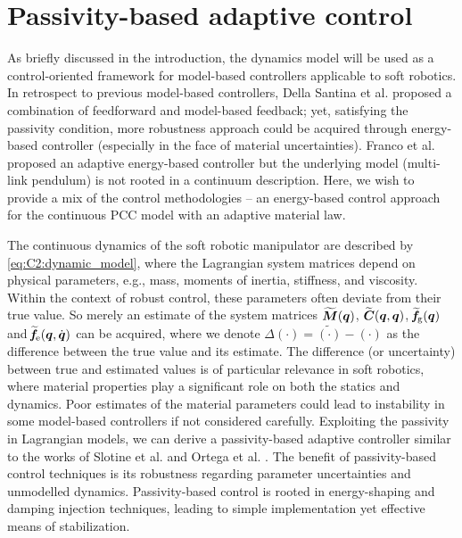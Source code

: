 \newpage
\section{Passivity-based adaptive control}
\noindent As briefly discussed in the introduction, the dynamics model will be used as a control-oriented framework for model-based controllers applicable to soft robotics. In retrospect to previous model-based controllers, Della Santina et al.  \cite{DellaSantina2020} proposed a combination of feedforward and model-based feedback; yet, satisfying the passivity condition, more robustness approach could be acquired through energy-based controller (especially in the face of material uncertainties). Franco et al. \cite{Franco2020} proposed an adaptive energy-based controller but the underlying model (multi-link pendulum) is not rooted in a continuum description. Here, we wish to provide a mix of the control methodologies -- an energy-based control approach for the continuous PCC model with an adaptive material law.

The continuous dynamics of the soft robotic manipulator are described by \eqref{eq:C2:dynamic_model}, where the Lagrangian system matrices depend on physical parameters, e.g., mass, moments of inertia, stiffness, and viscosity. Within the context of robust control, these parameters often deviate from their true value. So merely an estimate of the system matrices $\widetilde{\boldsymbol{M}}({\boldsymbol{q}})$, $\widetilde{\boldsymbol{C}}({\boldsymbol{q}},{\boldsymbol{q}})$, $\widetilde{\!\boldsymbol{f}}\!_{\scriptstyle\textrm{g}}({\boldsymbol{q}})$ and $\widetilde{\!\boldsymbol{f}}\!_{\scriptstyle\textrm{e}}({\boldsymbol{q}},{\dot{\boldsymbol{q}}})$ can be acquired, where we denote $
\Delta (\cdot) = \tilde{(\cdot)} - (\cdot)$ as the difference between the true value and its estimate. The difference (or uncertainty) between true and estimated values is of particular relevance in soft robotics, where material properties play a significant role on both the statics and dynamics. Poor estimates of the material parameters could lead to instability in some model-based controllers if not considered carefully. Exploiting the passivity in Lagrangian models, we can derive a passivity-based adaptive controller similar to the works of Slotine et al. \cite{Slotine1988} and Ortega et al. \cite{Ortega1998}. The benefit of passivity-based control techniques is its robustness regarding parameter uncertainties and unmodelled dynamics. Passivity-based control is rooted in energy-shaping and damping injection techniques, leading to simple implementation yet effective means of stabilization.
%

